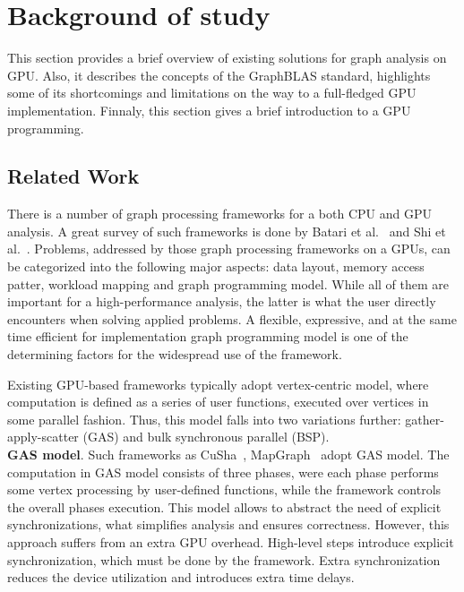 \section{Background of study}

This section provides a brief overview of existing solutions for graph analysis on GPU. Also, it describes the concepts of the GraphBLAS standard, highlights some of its shortcomings and limitations on the way to a full-fledged GPU implementation. Finnaly, this section gives a brief introduction to a GPU programming.

\subsection{Related Work}

There is a number of graph processing frameworks for a both CPU and GPU analysis. A great survey of such frameworks is done by Batari et al.~\cite{article:batarfi_survey_graphs} and Shi et al.~\cite{article:shi_survey_graphs}. Problems, addressed by those graph processing frameworks on a GPUs, can be categorized into the following major aspects: data layout, memory access patter, workload mapping and graph programming model. While all of them are important for a high-performance analysis, the latter is what the user directly encounters when solving applied problems. A flexible, expressive, and at the same time efficient for implementation graph programming model is one of the determining factors for the widespread use of the framework.

Existing GPU-based frameworks typically adopt vertex-centric model, where computation is defined as a series of user functions, executed over vertices in some parallel fashion. Thus, this model falls into two variations further: gather-apply-scatter (GAS) and bulk synchronous parallel (BSP).\\

\textbf{GAS model}. Such frameworks as CuSha~\cite{article:cusha}, MapGraph~\cite{article:MapGraph} adopt GAS model. The computation in GAS model consists of three phases, were each phase performs some vertex processing by user-defined functions, while the framework controls the overall phases execution. This model allows to abstract the need of explicit synchronizations, what simplifies analysis and ensures correctness. However, this approach suffers from an extra GPU overhead. High-level steps introduce explicit synchronization, which must be done by the framework. Extra synchronization reduces the device utilization and introduces extra time delays.\\

